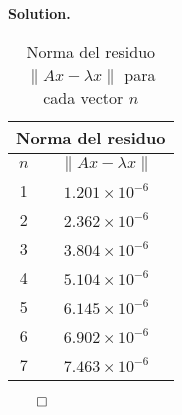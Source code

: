 \documentclass{article}
\theoremstyle{problemstyle}
\newenvironment{solution}{%
  \begin{mdframed}[linewidth=0.8pt,linecolor=Gray,backgroundcolor=Gray!5,roundcorner=5pt]%
  \noindent\textbf{Solution.}%
}{%
\hfill $ \qed $ 
  \end{mdframed}%
}
\begin{document}
\begin{solution}
\begin{enumerate}
		      \begin{table}[H]
			      \begin{center}
				      \begin{tabular}{|c|c|}
					      \multicolumn{2}{c}{Norma del residuo} \\
					      \hline
					      $n$ & $\lVert Ax - \lambda x \rVert$  \\
					      \hline
					      1   & $1.201 \times 10^{-6}$          \\
					      2   & $2.362 \times 10^{-6}$          \\
					      3   & $3.804 \times 10^{-6}$          \\
					      4   & $5.104 \times 10^{-6}$          \\
					      5   & $6.145 \times 10^{-6}$          \\
					      6   & $6.902 \times 10^{-6}$          \\
					      7   & $7.463 \times 10^{-6}$          \\
					      \hline
				      \end{tabular}
			      \end{center}
			      \caption{Norma del residuo $\lVert Ax - \lambda x \rVert$ para cada vector $n$}\label{tab:residual_norms}
		      \end{table}


\end{enumerate}
\end{solution}
\end{document}
